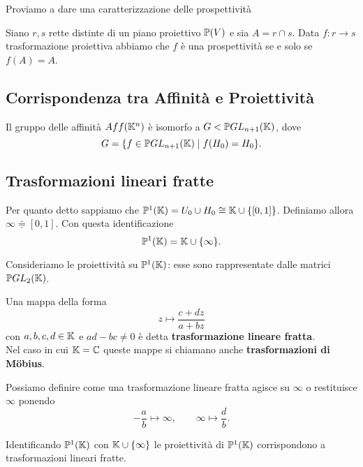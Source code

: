 \begin{multicols*}{2}
    \noindent
    Proviamo a dare una caratterizzazione delle prospettivit\`a
    \begin{theorem}\label{CaratterizzazioneProspettivita}
    Siano $r,s$ rette distinte di un piano proiettivo ${\mathbb{P}(V)}$ e sia $A=r\cap s$. Data $f:r\to s$ trasformazione proiettiva abbiamo che $f$ \`e una prospettivit\`a se e solo se $f(A)=A$.
    \end{theorem}

    \subsection{Corrispondenza tra Affinit\`a e Proiettivit\`a}
    \begin{proposition}\label{AffinitaComeProiettivita}
    Il gruppo delle affinit\`a $Aff(\mathbb{K}^n)$ \`e isomorfo a $G<\PGL[n+1]\K$, dove \[G=\{f\in \PGL[n+1]\K\mid f(H_0)=H_0\}.\]
    \end{proposition}
    \subsection{Trasformazioni lineari fratte}
    \begin{definition}[Infinito]
    Per quanto detto sappiamo che $\mathbb{P}^1(\mathbb{K})=U_0\cup H_0\cong \mathbb{K}\cup\{[0,1]\}$. Definiamo allora $\infty\doteqdot[0,1]$. Con questa identificazione
    \[\mathbb{P}^1(\mathbb{K})=\mathbb{K}\cup\{\infty\}.\]
    \end{definition}
    Consideriamo le proiettivit\`a su $\mathbb{P}^1(\mathbb{K})$: esse sono rappresentate dalle matrici $\PGL[2]\K$.
    \begin{definition}
    Una mappa della forma
    \[z\mapsto \frac{c+dz}{a+bz}\]
    con $a,b,c,d\in \mathbb{K}$ e $ad-bc\neq0$ \`e detta \textbf{trasformazione lineare fratta}.\\
    Nel caso in cui $\mathbb{K}=\mathbb{C}$ queste mappe si chiamano anche \textbf{trasformazioni di M\"obius}.
    \end{definition}
    \begin{remark}
    Possiamo definire come una trasformazione lineare fratta agisce su $\infty$ o restituisce $\infty$ ponendo
    \[-\frac ab\mapsto \infty,\qquad \infty\mapsto \frac db.\]
    \end{remark}
    \begin{proposition}
    Identificando $\mathbb{P}^1(\mathbb{K})$ con $\mathbb{K}\cup\{\infty\}$ le proiettivit\`a di $\mathbb{P}^1(\mathbb{K})$ corrispondono a trasformazioni lineari fratte.
    \end{proposition}



\end{multicols*}
